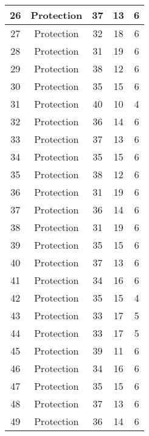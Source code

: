 \documentclass[results.tex]{subfiles}
\begin{document}
\begin{center}
\begin{tabular}{| c || c | c | c | c |}
    \hline
    26 & Protection & 37 & 13 & 6 \\ 
    \hline
    27 & Protection & 32 & 18 & 6 \\ 
    \hline
    28 & Protection & 31 & 19 & 6 \\ 
    \hline
    29 & Protection & 38 & 12 & 6 \\ 
    \hline
    30 & Protection & 35 & 15 & 6 \\ 
    \hline
    31 & Protection & 40 & 10 & 4 \\ 
    \hline
    32 & Protection & 36 & 14 & 6 \\ 
    \hline
    33 & Protection & 37 & 13 & 6 \\ 
    \hline
    34 & Protection & 35 & 15 & 6 \\ 
    \hline
    35 & Protection & 38 & 12 & 6 \\ 
    \hline
    36 & Protection & 31 & 19 & 6 \\ 
    \hline
    37 & Protection & 36 & 14 & 6 \\ 
    \hline
    38 & Protection & 31 & 19 & 6 \\ 
    \hline
    39 & Protection & 35 & 15 & 6 \\ 
    \hline
    40 & Protection & 37 & 13 & 6 \\ 
    \hline
    41 & Protection & 34 & 16 & 6 \\ 
    \hline
    42 & Protection & 35 & 15 & 4 \\ 
    \hline
    43 & Protection & 33 & 17 & 5 \\ 
    \hline
    44 & Protection & 33 & 17 & 5 \\ 
    \hline
    45 & Protection & 39 & 11 & 6 \\ 
    \hline
    46 & Protection & 34 & 16 & 6 \\ 
    \hline
    47 & Protection & 35 & 15 & 6 \\ 
    \hline
    48 & Protection & 37 & 13 & 6 \\ 
    \hline
    49 & Protection & 36 & 14 & 6 \\ 
    \hline   \end{tabular}
\end{center}
\end{document}
